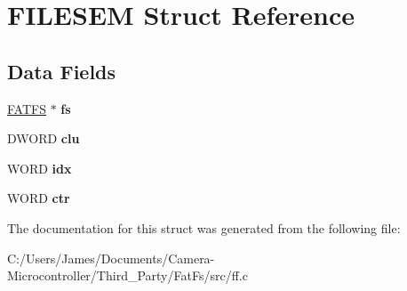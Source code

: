 \hypertarget{struct_f_i_l_e_s_e_m}{}\section{F\+I\+L\+E\+S\+EM Struct Reference}
\label{struct_f_i_l_e_s_e_m}
\subsection*{Data Fields}
\begin{DoxyCompactItemize}
\item 
\mbox{\label{struct_f_i_l_e_s_e_m_ae363a794e38f3a9aa1d55b8e3c7fcee7}} 
\hyperlink{struct_f_a_t_f_s}{F\+A\+T\+FS} $\ast$ {\bfseries fs}
\item 
\mbox{\label{struct_f_i_l_e_s_e_m_a410fabf6885f65a5fc19131ffa9dea54}} 
D\+W\+O\+RD {\bfseries clu}
\item 
\mbox{\label{struct_f_i_l_e_s_e_m_a49b0f506edbc46ccdc740207846de70e}} 
W\+O\+RD {\bfseries idx}
\item 
\mbox{\label{struct_f_i_l_e_s_e_m_a6b0aa6eb10c599bb798b76c7a4bf91c4}} 
W\+O\+RD {\bfseries ctr}
\end{DoxyCompactItemize}


The documentation for this struct was generated from the following file\+:\begin{DoxyCompactItemize}
\item 
C\+:/\+Users/\+James/\+Documents/\+Camera-\/\+Microcontroller/\+Third\+\_\+\+Party/\+Fat\+Fs/src/ff.\+c\end{DoxyCompactItemize}
